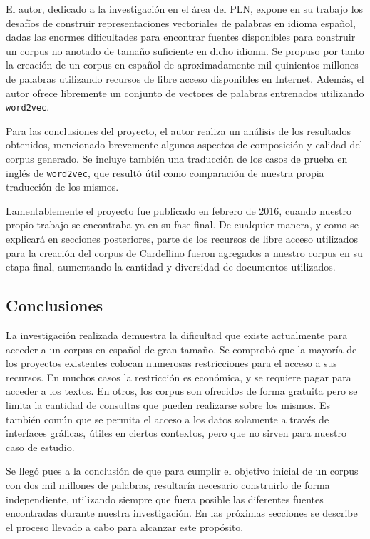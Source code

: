 El autor, dedicado a la investigación en el área del PLN, expone en su trabajo los desafíos de construir
representaciones vectoriales de palabras en idioma español, dadas las enormes dificultades para encontrar
fuentes disponibles para construir un corpus no anotado de tamaño suficiente en dicho idioma. Se propuso
por tanto la creación de un corpus en español de aproximadamente mil quinientos millones de palabras
utilizando recursos de libre acceso disponibles en Internet. Además, el autor ofrece libremente un
conjunto de vectores de palabras entrenados utilizando \texttt{word2vec}.

Para las conclusiones del proyecto, el autor realiza un análisis de los resultados obtenidos, mencionado
brevemente algunos aspectos de composición y calidad del corpus generado. Se incluye también una
traducción de los casos de prueba en inglés de \texttt{word2vec}, que resultó útil como comparación de
nuestra propia traducción de los mismos.

Lamentablemente el proyecto fue publicado en febrero de 2016, cuando nuestro propio trabajo se
encontraba ya en su fase final. De cualquier manera, y como se explicará en secciones posteriores,
parte de los recursos de libre acceso utilizados para la creación del corpus de Cardellino fueron
agregados a nuestro corpus en su etapa final, aumentando la cantidad y diversidad de documentos
utilizados.

\subsection{Conclusiones}

La investigación realizada demuestra la dificultad que existe actualmente para acceder a un corpus en
español de gran tamaño. Se comprobó que la mayoría de los proyectos existentes colocan
numerosas restricciones para el acceso a sus recursos. En muchos casos la restricción es económica,
y se requiere pagar para acceder a los textos. En otros, los corpus son ofrecidos de forma gratuita pero
se limita la cantidad de consultas que pueden realizarse sobre los mismos. Es también común que se
permita el acceso a los datos solamente a través de interfaces gráficas, útiles en ciertos contextos, pero
que no sirven para nuestro caso de estudio.

Se llegó pues a la conclusión de que para cumplir el objetivo inicial de un corpus con dos mil millones
de palabras, resultaría necesario construirlo de forma independiente, utilizando siempre que fuera
posible las diferentes fuentes encontradas durante nuestra investigación. En las próximas secciones
se describe el proceso llevado a cabo para alcanzar este propósito.


